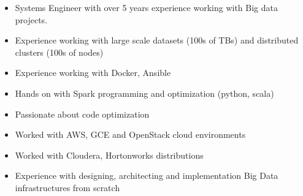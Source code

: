 

\begin{cvparagraph}

\begin{itemize}
	\item Systems Engineer with over 5 years experience working with Big data projects.
	\item Experience working with large scale datasets (100s of TBs) and distributed clusters (100s of nodes)
	\item Experience working with Docker, Ansible
        \item Hands on with Spark programming and optimization (python, scala)
	\item Passionate about code optimization
	\item Worked with AWS, GCE and OpenStack cloud environments
	\item Worked with Cloudera, Hortonworks distributions
        \item Experience with designing, architecting and implementation Big Data infrastructures from scratch
\end{itemize}
\end{cvparagraph}
